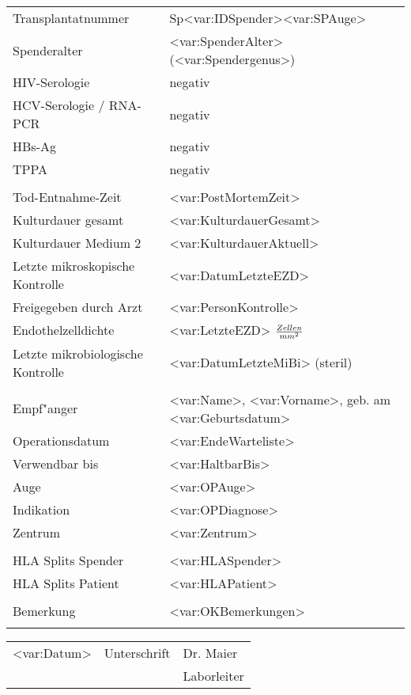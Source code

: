 \documentclass[a4]{scrreprt}
\begin{document}
\begin{table}
\begin{tabular}{lp{9cm}} \hline
Transplantatnummer & Sp<var:IDSpender><var:SPAuge>\\
Spenderalter & <var:SpenderAlter> (<var:Spendergenus>)\\
HIV-Serologie & negativ\\
HCV-Serologie / RNA-PCR & negativ\\
HBs-Ag & negativ\\
TPPA & negativ\\
\\
Tod-Entnahme-Zeit  & <var:PostMortemZeit>	
\\
Kulturdauer gesamt & <var:KulturdauerGesamt> \\
Kulturdauer Medium 2 & <var:KulturdauerAktuell> \\
Letzte mikroskopische Kontrolle & <var:DatumLetzteEZD> \\
Freigegeben durch Arzt & <var:PersonKontrolle> \\
Endothelzelldichte & <var:LetzteEZD> ${Zellen \over mm^{2} }$ \\
Letzte mikrobiologische Kontrolle & <var:DatumLetzteMiBi> (steril) \\
\\ \hline
Empf"anger & <var:Name>, <var:Vorname>, geb. am <var:Geburtsdatum>\\
Operationsdatum & <var:EndeWarteliste>\\ 
Verwendbar bis  & <var:HaltbarBis>\\
Auge & <var:OPAuge>\\ 
Indikation & <var:OPDiagnose>\\ 
Zentrum & <var:Zentrum>\\ 
\\ \hline
HLA Splits Spender & <var:HLASpender>\\
HLA Splits Patient & <var:HLAPatient>\\
\\ \hline
Bemerkung & <var:OKBemerkungen>\\ \hline
\\
\end{tabular}
\begin{tabular}{p{2cm}p{3.2cm}l}
<var:Datum> & Unterschrift  & Dr. Maier\\
&& Laborleiter\\
\end{tabular}
\end{table}
\end{document}
